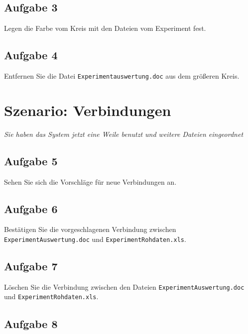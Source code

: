 \documentclass[12pt,]{article}
\begin{document}
\newpage

\subsection{Aufgabe 3}

Legen die Farbe vom Kreis mit den Dateien vom Experiment fest.

\newpage

\subsection{Aufgabe 4}

Entfernen Sie die Datei \texttt{Experimentauswertung.doc} aus dem
größeren Kreis.

\newpage

\section{Szenario: Verbindungen}

\emph{Sie haben das System jetzt eine Weile benutzt und weitere Dateien
eingeordnet}

\subsection{Aufgabe 5}

Sehen Sie sich die Vorschläge für neue Verbindungen an.

\newpage

\subsection{Aufgabe 6}

Bestätigen Sie die vorgeschlagenen Verbindung zwischen
\texttt{ExperimentAuswertung.doc} und \texttt{ExperimentRohdaten.xls}.

\newpage

\subsection{Aufgabe 7}

Löschen Sie die Verbindung zwischen den Dateien
\texttt{ExperimentAuswertung.doc} und \texttt{ExperimentRohdaten.xls}.

\newpage

\subsection{Aufgabe 8}
\end{document}
